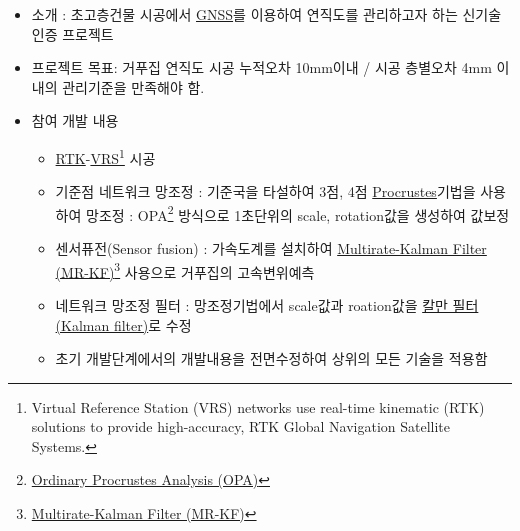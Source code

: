 \begin{itemize}[label=]
	\item 소개 : 초고층건물 시공에서 \href{http://gnss.ngii.go.kr/info/summary}{GNSS}를 이용하여 연직도를 관리하고자 하는 신기술 인증 프로젝트
	\item 프로젝트 목표: 거푸집 연직도 시공 누적오차 10mm이내 / 시공 층별오차 4mm 이내의 관리기준을 만족해야 함.
	\item 참여 개발 내용
	      \begin{itemize}[label=]
		      \item \href{https://en.wikipedia.org/wiki/Real_Time_Kinematic}{RTK}-\href{https://en.wikipedia.org/wiki/Virtual_Reference_Station}{VRS}\footnote{Virtual Reference Station (VRS) networks use real-time kinematic (RTK) solutions to provide high-accuracy, RTK Global Navigation Satellite Systems.} 시공
		      \item 기준점 네트워크 망조정 : 기준국을 타설하여 3점, 4점 \href{https://en.wikipedia.org/wiki/Procrustes_analysis}{Procrustes}기법을 사용하여 망조정 : OPA\footnote{\href{https://en.wikipedia.org/wiki/Procrustes_analysis}{Ordinary Procrustes Analysis (OPA)}} 방식으로 1초단위의 scale, rotation값을 생성하여 값보정
		      \item 센서퓨전(Sensor fusion) : 가속도계를 설치하여 \href{http://scholar.lib.vt.edu/theses/available/etd-062899-064821/unrestricted/etd.PDF}{Multirate-Kalman Filter (MR-KF)}\footnote{\href{http://scholar.lib.vt.edu/theses/available/etd-062899-064821/unrestricted/etd.PDF}{Multirate-Kalman Filter (MR-KF)}} 사용으로 거푸집의 고속변위예측
		      \item 네트워크 망조정 필터 : 망조정기법에서 scale값과 roation값을 \href{https://ko.wikipedia.org/wiki/\%EC\%B9\%BC\%EB\%A7\%8C_\%ED\%95\%84\%ED\%84\%B0}{칼만 필터(Kalman filter)}로 수정
		      \item 초기 개발단계에서의 개발내용을 전면수정하여 상위의 모든 기술을 적용함


\end{itemize}
\end{itemize}
